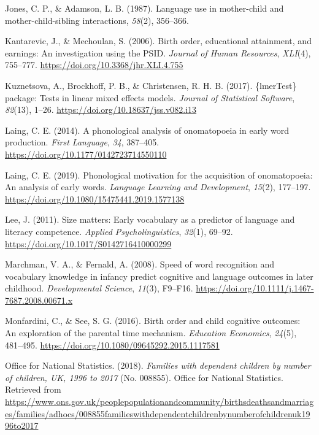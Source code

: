 \documentclass[man,floatsintext]{apa6}
\begin{document}
\leavevmode\hypertarget{ref-jones_language_1987}{}%
Jones, C. P., \& Adamson, L. B. (1987). Language use in mother-child and mother-child-sibling interactions, \emph{58}(2), 356--366.

\leavevmode\hypertarget{ref-kantarevic_birth_2006}{}%
Kantarevic, J., \& Mechoulan, S. (2006). Birth order, educational attainment, and earnings: An investigation using the PSID. \emph{Journal of Human Resources}, \emph{XLI}(4), 755--777. \url{https://doi.org/10.3368/jhr.XLI.4.755}

\leavevmode\hypertarget{ref-kuznetsova_lmertest_2017}{}%
Kuznetsova, A., Brockhoff, P. B., \& Christensen, R. H. B. (2017). \{lmerTest\} package: Tests in linear mixed effects models. \emph{Journal of Statistical Software}, \emph{82}(13), 1--26. \url{https://doi.org/10.18637/jss.v082.i13}

\leavevmode\hypertarget{ref-laing_phonological_2014}{}%
Laing, C. E. (2014). A phonological analysis of onomatopoeia in early word production. \emph{First Language}, \emph{34}, 387--405. \url{https://doi.org/10.1177/0142723714550110}

\leavevmode\hypertarget{ref-laing_phonological_2019}{}%
Laing, C. E. (2019). Phonological motivation for the acquisition of onomatopoeia: An analysis of early words. \emph{Language Learning and Development}, \emph{15}(2), 177--197. \url{https://doi.org/10.1080/15475441.2019.1577138}

\leavevmode\hypertarget{ref-lee_size_2011}{}%
Lee, J. (2011). Size matters: Early vocabulary as a predictor of language and literacy competence. \emph{Applied Psycholinguistics}, \emph{32}(1), 69--92. \url{https://doi.org/10.1017/S0142716410000299}

\leavevmode\hypertarget{ref-marchman_speed_2008}{}%
Marchman, V. A., \& Fernald, A. (2008). Speed of word recognition and vocabulary knowledge in infancy predict cognitive and language outcomes in later childhood. \emph{Developmental Science}, \emph{11}(3), F9--F16. \url{https://doi.org/10.1111/j.1467-7687.2008.00671.x}

\leavevmode\hypertarget{ref-monfardini_birth_2016}{}%
Monfardini, C., \& See, S. G. (2016). Birth order and child cognitive outcomes: An exploration of the parental time mechanism. \emph{Education Economics}, \emph{24}(5), 481--495. \url{https://doi.org/10.1080/09645292.2015.1117581}

\leavevmode\hypertarget{ref-office_for_national_statistics_families_2018}{}%
Office for National Statistics. (2018). \emph{Families with dependent children by number of children, UK, 1996 to 2017} (No. 008855). Office for National Statistics. Retrieved from \url{https://www.ons.gov.uk/peoplepopulationandcommunity/birthsdeathsandmarriages/families/adhocs/008855familieswithdependentchildrenbynumberofchildrenuk1996to2017}
\end{document}

